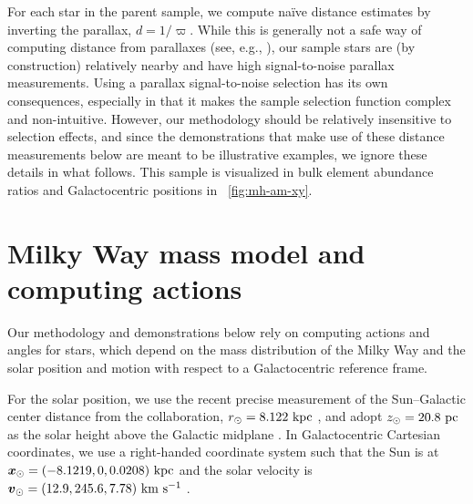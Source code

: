 \documentclass[modern]{aastex63}
\begin{document}
For each star in the parent sample, we compute na\"ive distance estimates by
inverting the parallax, $d = 1/\varpi$.
While this is generally not a safe way of computing distance from parallaxes
(see, e.g., \citealt{Bailer-Jones:2015}), our sample stars are (by construction)
relatively nearby and have high signal-to-noise parallax measurements.
Using a parallax signal-to-noise selection has its own consequences, especially
in that it makes the sample selection function complex and non-intuitive.
However, our methodology should be relatively insensitive to selection effects,
and since the demonstrations that make use of these distance measurements below
are meant to be illustrative examples, we ignore these details in what follows.
This sample is visualized in bulk element abundance ratios and Galactocentric
positions in \figurename~\ref{fig:mh-am-xy}.


\section{Milky Way mass model and computing actions}
\label{sec:mw-model}

Our methodology and demonstrations below rely on computing actions and angles
for stars, which depend on the mass distribution of the Milky Way and the solar
position and motion with respect to a Galactocentric reference frame.

For the solar position, we use the recent precise measurement of the
Sun--Galactic center distance from the  collaboration, $r_\odot
= 8.122~\mathrm{kpc}$ \citep{Gravity:2018}, and adopt $z_\odot = 20.8~\mathrm{pc}$ as the solar
height above the Galactic midplane \citep{Bennett:2019}.
In Galactocentric Cartesian coordinates, we use a right-handed coordinate system
such that the Sun is at $\boldsymbol{x}_\odot = (-8.1219, 0, 0.0208)~\mathrm{kpc}$ and the
solar velocity is $\boldsymbol{v}_\odot = (12.9, 245.6, 7.78)~\mathrm{km}~\mathrm{s}^{-1}$ \citep{Drimmel:2018,
Reid:2004, Gravity:2018}.
\end{document}
